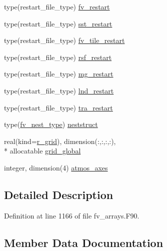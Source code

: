 \begin{DoxyCompactItemize}
\item 
type(restart\-\_\-file\-\_\-type) \hyperlink{structfv__arrays__mod_1_1fv__atmos__type_a81c0a2a6d32e9d1ec76ba25429fe964e}{fv\-\_\-restart}
\item 
type(restart\-\_\-file\-\_\-type) \hyperlink{structfv__arrays__mod_1_1fv__atmos__type_acb55bff833b0e9724ee32485d24abeab}{sst\-\_\-restart}
\item 
type(restart\-\_\-file\-\_\-type) \hyperlink{structfv__arrays__mod_1_1fv__atmos__type_ab4acfb059f86162ac82b1a11612f1610}{fv\-\_\-tile\-\_\-restart}
\item 
type(restart\-\_\-file\-\_\-type) \hyperlink{structfv__arrays__mod_1_1fv__atmos__type_a3d76489d7309fe00ff9417911e8d3fb5}{rsf\-\_\-restart}
\item 
type(restart\-\_\-file\-\_\-type) \hyperlink{structfv__arrays__mod_1_1fv__atmos__type_a80c75e3c3ef687cdfed8ab388c243dc2}{mg\-\_\-restart}
\item 
type(restart\-\_\-file\-\_\-type) \hyperlink{structfv__arrays__mod_1_1fv__atmos__type_a343bed7b2fae51453d57bcef96ac919d}{lnd\-\_\-restart}
\item 
type(restart\-\_\-file\-\_\-type) \hyperlink{structfv__arrays__mod_1_1fv__atmos__type_ab394a0387bd944dd57cb09a3abc5abfa}{tra\-\_\-restart}
\item 
type(\hyperlink{structfv__arrays__mod_1_1fv__nest__type}{fv\-\_\-nest\-\_\-type}) \hyperlink{structfv__arrays__mod_1_1fv__atmos__type_a0de20030b672c84ef5f1eec9360ccf61}{neststruct}
\item 
real(kind=\hyperlink{classfv__arrays__mod_ab0ba8527d270f349a84fa0a330be1923}{r\-\_\-grid}), dimension(\-:,\-:,\-:,\-:), \\*
allocatable \hyperlink{structfv__arrays__mod_1_1fv__atmos__type_adc565026ec8a2ef0abafa0445987e923}{grid\-\_\-global}
\item 
integer, dimension(4) \hyperlink{structfv__arrays__mod_1_1fv__atmos__type_a32f9a169b6f3e0c138d9e069d6916083}{atmos\-\_\-axes}
\end{DoxyCompactItemize}


\subsection{Detailed Description}


Definition at line 1166 of file fv\-\_\-arrays.\-F90.



\subsection{Member Data Documentation}
